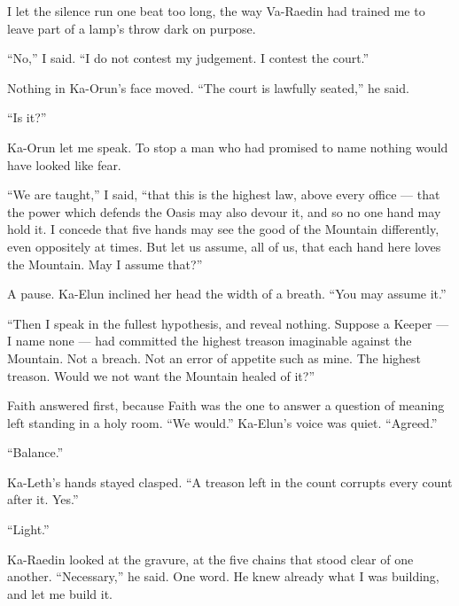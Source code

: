 \ornament
 
I let the silence run one beat too long, the way Va-Raedin had trained me to leave part of a lamp's throw dark on purpose.\par
 
``No,'' I said. ``I do not contest my judgement. I contest the court.''\par
 
Nothing in Ka-Orun's face moved. ``The court is lawfully seated,'' he said.\par
 
``Is it?'' 
 
Ka-Orun let me speak. To stop a man who had promised to name nothing would have looked like fear.\par
 
``We are taught,'' I said, ``that this is the highest law, above every office --- that the power which defends the Oasis may also devour it, and so no one hand may hold it. I concede that five hands may see the good of the Mountain differently, even oppositely at times. But let us assume, all of us, that each hand here loves the Mountain. May I assume that?''\par
 
A pause. Ka-Elun inclined her head the width of a breath. ``You may assume it.''\par
 
``Then I speak in the fullest hypothesis, and reveal nothing. Suppose a Keeper --- I name none --- had committed the highest treason imaginable against the Mountain. Not a breach. Not an error of appetite such as mine. The highest treason. Would we not want the Mountain healed of it?''\par
 
Faith answered first, because Faith was the one to answer a question of meaning left standing in a holy room. ``We would.'' Ka-Elun's voice was quiet. ``Agreed.''\par

``Balance.''\par

Ka-Leth's hands stayed clasped. ``A treason left in the count corrupts every count after it. Yes.''\par

``Light.''\par

Ka-Raedin looked at the gravure, at the five chains that stood clear of one another. ``Necessary,'' he said. One word. He knew already what I was building, and let me build it.\par

